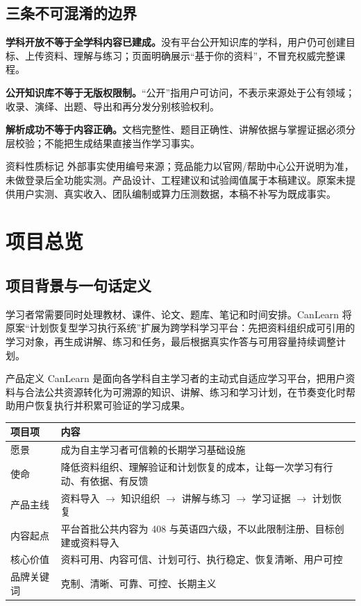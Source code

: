 \documentclass[UTF8,a4paper,11pt,fontset=none]{ctexart}
\newcommand{\cth}[1]{\textbf{\sffamily #1}}
\newcommand{\newsec}[1]{\clearpage\section{#1}}
\newenvironment{tbl}{\par\vspace{3pt}\small\noindent\ignorespaces}{\unskip\par\vspace{5pt}}
\begin{document}
\subsection*{三条不可混淆的边界}
\textbf{学科开放不等于全学科内容已建成。}没有平台公开知识库的学科，用户仍可创建目标、上传资料、理解与练习；页面明确展示“基于你的资料”，不冒充权威完整课程。

\textbf{公开知识库不等于无版权限制。}“公开”指用户可访问，不表示来源处于公有领域；收录、演绎、出题、导出和再分发分别核验权利。

\textbf{解析成功不等于内容正确。}文档完整性、题目正确性、讲解依据与掌握证据必须分层校验；不能把生成结果直接当作学习事实。

\begin{caution}{资料性质标记}
外部事实使用编号来源；竞品能力以官网/帮助中心公开说明为准，未做登录后全功能实测。产品设计、工程建议和试验阈值属于本稿建议。原案未提供用户实测、真实收入、团队编制或算力压测数据，本稿不补写为既成事实。
\end{caution}

\newsec{项目总览}
\subsection{项目背景与一句话定义}
学习者常需要同时处理教材、课件、论文、题库、笔记和时间安排。CanLearn 将原案“计划恢复型学习执行系统”扩展为跨学科学习平台：先把资料组织成可引用的学习对象，再生成讲解、练习和任务，最后根据真实作答与可用容量持续调整计划。\cite{original}

\begin{insight}{产品定义}
CanLearn 是面向各学科自主学习者的主动式自适应学习平台，把用户资料与合法公共资源转化为可溯源的知识、讲解、练习和学习计划，在节奏变化时帮助用户恢复执行并积累可验证的学习成果。
\end{insight}

\begin{tbl}
\begin{tabularx}{\linewidth}{@{}L{27mm}Y@{}}
\toprule
\cth{项目项}&\cth{内容}\\\midrule
愿景&成为自主学习者可信赖的长期学习基础设施\\
使命&降低资料组织、理解验证和计划恢复的成本，让每一次学习有行动、有依据、有反馈\\
产品主线&资料导入 $\rightarrow$ 知识组织 $\rightarrow$ 讲解与练习 $\rightarrow$ 学习证据 $\rightarrow$ 计划恢复\\
内容起点&平台首批公共内容为 408 与英语四六级，不以此限制注册、目标创建或资料导入\\
核心价值&资料可用、内容可信、计划可行、执行稳定、恢复清晰、用户可控\\
品牌关键词&克制、清晰、可靠、可控、长期主义\\
\bottomrule
\end{tabularx}
\end{tbl}
\end{document}

